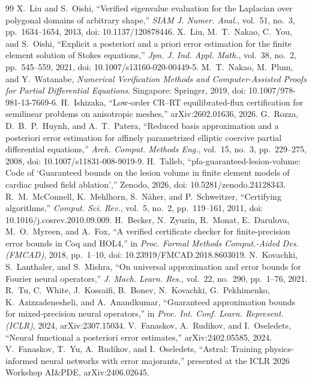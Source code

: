 \documentclass[11pt]{article}
\begin{document}
\begin{thebibliography}{99}
 X.~Liu and S.~Oishi, ``Verified eigenvalue evaluation for the Laplacian over polygonal domains of arbitrary shape,'' \emph{SIAM J. Numer. Anal.}, vol.~51, no.~3, pp.~1634--1654, 2013, doi: 10.1137/120878446.
 X.~Liu, M.~T.~Nakao, C.~You, and S.~Oishi, ``Explicit a posteriori and a priori error estimation for the finite element solution of Stokes equations,'' \emph{Jpn. J. Ind. Appl. Math.}, vol.~38, no.~2, pp.~545--559, 2021, doi: 10.1007/s13160-020-00449-5.
 M.~T.~Nakao, M.~Plum, and Y.~Watanabe, \emph{Numerical Verification Methods and Computer-Assisted Proofs for Partial Differential Equations}. Singapore: Springer, 2019, doi: 10.1007/978-981-13-7669-6.
 H.~Ishizaka, ``Low-order CR--RT equilibrated-flux certification for semilinear problems on anisotropic meshes,'' arXiv:2602.01636, 2026.
 G.~Rozza, D.~B.~P.~Huynh, and A.~T.~Patera, ``Reduced basis approximation and a posteriori error estimation for affinely parametrized elliptic coercive partial differential equations,'' \emph{Arch. Comput. Methods Eng.}, vol.~15, no.~3, pp.~229--275, 2008, doi: 10.1007/s11831-008-9019-9.
 H.~Talleb, ``pfa-guaranteed-lesion-volume: Code of `Guaranteed bounds on the lesion volume in finite element models of cardiac pulsed field ablation','' Zenodo, 2026, doi: 10.5281/zenodo.24128343.
 R.~M.~McConnell, K.~Mehlhorn, S.~N\"aher, and P.~Schweitzer, ``Certifying algorithms,'' \emph{Comput. Sci. Rev.}, vol.~5, no.~2, pp.~119--161, 2011, doi: 10.1016/j.cosrev.2010.09.009.
 H.~Becker, N.~Zyuzin, R.~Monat, E.~Darulova, M.~O.~Myreen, and A.~Fox, ``A verified certificate checker for finite-precision error bounds in Coq and HOL4,'' in \emph{Proc. Formal Methods Comput.-Aided Des. (FMCAD)}, 2018, pp.~1--10, doi: 10.23919/FMCAD.2018.8603019.
 N.~Kovachki, S.~Lanthaler, and S.~Mishra, ``On universal approximation and error bounds for Fourier neural operators,'' \emph{J. Mach. Learn. Res.}, vol.~22, no.~290, pp.~1--76, 2021.
 R.~Tu, C.~White, J.~Kossaifi, B.~Bonev, N.~Kovachki, G.~Pekhimenko, K.~Azizzadenesheli, and A.~Anandkumar, ``Guaranteed approximation bounds for mixed-precision neural operators,'' in \emph{Proc. Int. Conf. Learn. Represent. (ICLR)}, 2024, arXiv:2307.15034.
 V.~Fanaskov, A.~Rudikov, and I.~Oseledets, ``Neural functional a posteriori error estimates,'' arXiv:2402.05585, 2024.
 V.~Fanaskov, T.~Yu, A.~Rudikov, and I.~Oseledets, ``Astral: Training physics-informed neural networks with error majorants,'' presented at the ICLR 2026 Workshop AI\&PDE, arXiv:2406.02645.

\end{thebibliography}
\end{document}
